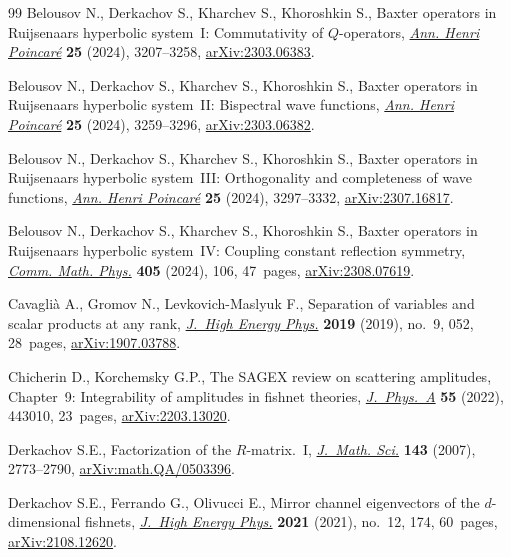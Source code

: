\documentclass[10pt,a4paper]{amsart}
\numberwithin{equation}{section}
\begin{document}
\begin{thebibliography}{99}
Belousov N., Derkachov S., Kharchev S., Khoroshkin S., Baxter operators in
 {R}uijsenaars hyperbolic system~{I}: {C}ommutativity of {$Q$}-operators,
 \href{https://doi.org/10.1007/s00023-023-01364-4}{\textit{Ann. Henri
 Poincar\'e}} \textbf{25} (2024), 3207--3258,
 \href{http://arxiv.org/abs/2303.06383}{arXiv:2303.06383}.

Belousov N., Derkachov S., Kharchev S., Khoroshkin S., Baxter operators in
 {R}uijsenaars hyperbolic system~{II}: {B}ispectral wave functions,
 \href{https://doi.org/10.1007/s00023-023-01385-z}{\textit{Ann. Henri
 Poincar\'e}} \textbf{25} (2024), 3259--3296,
 \href{http://arxiv.org/abs/2303.06382}{arXiv:2303.06382}.

Belousov N., Derkachov S., Kharchev S., Khoroshkin S., Baxter operators in
 {R}uijsenaars hyperbolic system~{III}: {O}rthogonality and completeness of
 wave functions,
 \href{https://doi.org/10.1007/s00023-023-01406-x}{\textit{Ann. Henri
 Poincar\'e}} \textbf{25} (2024), 3297--3332,
 \href{http://arxiv.org/abs/2307.16817}{arXiv:2307.16817}.

Belousov N., Derkachov S., Kharchev S., Khoroshkin S., Baxter operators in
 {R}uijsenaars hyperbolic system~{IV}: {C}oupling constant reflection
 symmetry, \href{https://doi.org/10.1007/s00220-024-04952-5}{\textit{Comm.
 Math. Phys.}} \textbf{405} (2024), 106, 47~pages,
 \href{http://arxiv.org/abs/2308.07619}{arXiv:2308.07619}.

Cavagli\`a A., Gromov N., Levkovich-Maslyuk F., Separation of variables and
 scalar products at any rank,
 \href{https://doi.org/10.1007/jhep09(2019)052}{\textit{J.~High Energy Phys.}}
 \textbf{2019} (2019), no.~9, 052, 28~pages,
 \href{http://arxiv.org/abs/1907.03788}{arXiv:1907.03788}.

Chicherin D., Korchemsky G.P., The {SAGEX} review on scattering amplitudes,
 {C}hapter~9: {I}ntegrability of amplitudes in fishnet theories,
 \href{https://doi.org/10.1088/1751-8121/ac8c72}{\textit{J.~Phys.~A}}
 \textbf{55} (2022), 443010, 23~pages,
 \href{http://arxiv.org/abs/2203.13020}{arXiv:2203.13020}.

Derkachov S.E., Factorization of the {$R$}-matrix.~{I},
 \href{https://doi.org/10.1007/s10958-007-0164-8}{\textit{J.~Math. Sci.}}
 \textbf{143} (2007), 2773--2790,
 \href{http://arxiv.org/abs/math.QA/0503396}{arXiv:math.QA/0503396}.


Derkachov S.E., Ferrando G., Olivucci E., Mirror channel eigenvectors of the
 {$d$}-dimensional fishnets,
 \href{https://doi.org/10.1007/jhep12(2021)174}{\textit{J.~High Energy Phys.}}
 \textbf{2021} (2021), no.~12, 174, 60~pages,
 \href{http://arxiv.org/abs/2108.12620}{arXiv:2108.12620}.


\end{thebibliography}
\end{document}
